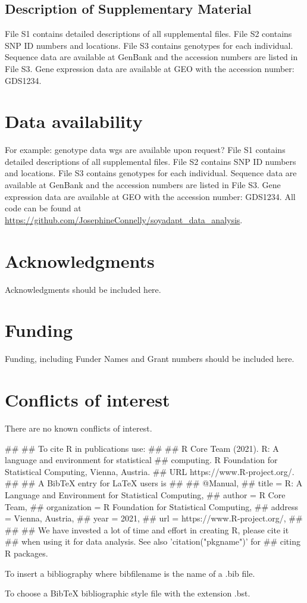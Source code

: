 \documentclass[9pt, onecolumn,twoside]{gsajnl}
\begin{document}
\subsection{Description of Supplementary Material}
File S1 contains detailed descriptions of all supplemental files. 
File S2 contains SNP ID numbers and locations. File S3 contains genotypes for each individual. Sequence data are available at GenBank and the accession numbers are listed in File S3. Gene expression data are available at GEO with the accession number: GDS1234. 

\section{Data availability}
\label{sec:data:availability}
For example: genotype data wgs are available upon request? 
File S1 contains detailed descriptions of all supplemental files. File S2 contains SNP ID numbers and locations. File S3 contains genotypes for each individual. Sequence data are available at GenBank and the accession numbers are listed in File S3. Gene expression data are available at GEO with the accession number: GDS1234. 
All code can be found at \url{https://github.com/JosephineConnelly/soyadapt_data_analysis}.

\section{Acknowledgments}
Acknowledgments should be included here.

\section{Funding}
Funding, including Funder Names and Grant numbers should be included here.

\section{Conflicts of interest}
There are  no known conflicts of interest.

## 
## To cite R in publications use:
## 
##   R Core Team (2021). R: A language and environment for statistical
##   computing. R Foundation for Statistical Computing, Vienna, Austria.
##   URL https://www.R-project.org/.
## 
## A BibTeX entry for LaTeX users is
## 
##   @Manual{,
##     title = {R: A Language and Environment for Statistical Computing},
##     author = {{R Core Team}},
##     organization = {R Foundation for Statistical Computing},
##     address = {Vienna, Austria},
##     year = {2021},
##     url = {https://www.R-project.org/},
##   }
## 
## We have invested a lot of time and effort in creating R, please cite it
## when using it for data analysis. See also 'citation("pkgname")' for
## citing R packages.



    To insert a bibliography where bibfilename is the name of a .bib file.



        To choose a BibTeX bibliographic style file with the extension .bst.
\end{document}
